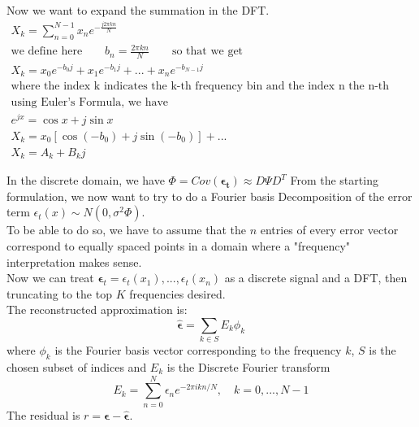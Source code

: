 Now we want to expand the summation in the DFT. 
\begin{gather*}
    X_k = \sum_{n=0}^{N-1} x_n e^{- \frac{j 2 \pi k n}{N}} \\
    \text{we define here} \qquad b_n = \frac{2 \pi k n }{N} \qquad \text{so that we get} \\
    X_k = x_0 e^{-b_0j} + x_1e^{-b_1j} + ... + x_ne^{-b_{N-1}j} \\
    \text{where the index k indicates the k-th frequency bin and the index n the n-th sample value} \\
    \text{using Euler's Formula, we have} \\
    e^{jx} = \cos x + j \sin x \\
    X_k = x_0[\cos(-b_0) + j \sin(-b_0)] + ... \\
    X_k = A_k + B_kj
\end{gather*}


In the discrete domain, we have $\Phi = Cov(\boldsymbol{\epsilon_t})\approx D \Psi D^T$
From the starting formulation, we now want to try to do a Fourier basis Decomposition of the error term $\epsilon_t(x) \sim N(0, \sigma^2 \Phi)$. \\
To be able to do so, we have to assume that the $n$ entries of every error vector correspond to equally spaced points in a domain where a "frequency" interpretation makes sense. \\
Now we can treat $\boldsymbol{\epsilon}_t = \epsilon_t(x_1), ..., \epsilon_t(x_n)$ as a discrete signal and a DFT, then truncating to the top $K$ frequencies desired. \\
The reconstructed approximation is: 
\begin{equation}
    \hat{\boldsymbol{\epsilon}} =   \sum_{k \in S}E_k \phi_k
\end{equation}
where $\phi_k$ is the Fourier basis vector corresponding to the frequency $k$, $S$ is the chosen subset of indices and $E_k$ is the Discrete Fourier transform
\begin{equation}
    E_k = \sum_{n=0}^N \epsilon_n e^{- 2 \pi i k n /N}, \quad k=0, ..., N-1
\end{equation}
The residual is $r = \boldsymbol{\epsilon} - \hat{\boldsymbol{\epsilon}}$.